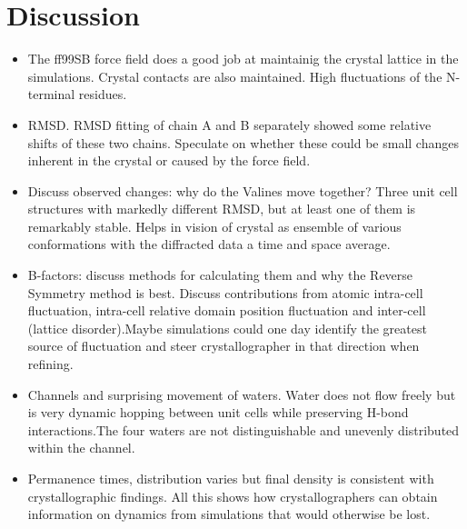 \documentclass[12pt,letterpaper]{report}
\begin{document}
\section{Discussion}
\begin{itemize}
\item The ff99SB force field does a good job at maintainig the crystal lattice in the simulations. Crystal contacts are also maintained. High fluctuations of the N-terminal residues.
\item RMSD. RMSD fitting of chain A and B separately showed some relative shifts of these two chains. Speculate on whether these could be small changes inherent in the crystal or caused by the force field. 
\item Discuss observed changes: why do the Valines move together? Three unit cell structures with markedly different RMSD, but at least one of them is remarkably stable. Helps in vision of crystal as ensemble of various conformations with the diffracted data a time and space average. 
\item B-factors: discuss methods for calculating them and why the Reverse Symmetry method is best. Discuss contributions from atomic intra-cell fluctuation, intra-cell relative domain position fluctuation and inter-cell (lattice disorder).Maybe simulations could one day identify the greatest source of fluctuation and steer crystallographer in that direction when refining.
\item Channels and surprising movement of waters. Water does not flow freely but is very dynamic hopping between unit cells while preserving H-bond interactions.The four waters are not distinguishable and unevenly distributed within the channel.
\item Permanence times, distribution varies but final density is consistent with crystallographic findings. All this shows how crystallographers can obtain information on dynamics from simulations that would otherwise be lost. 

\end{itemize}
\end{document}

